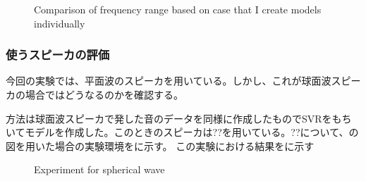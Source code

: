 \begin{figure}[t]
{     \label{fig:6000}}         
     \caption{Comparison of frequency range based on case that I create models individually}
    \label{fig:result_freq_renge_2}
\end{figure}
\clearpage

\subsubsection{使うスピーカの評価}
\label{sec:result_svr_speaker}
今回の実験では、平面波のスピーカを用いている。しかし、これが球面波スピーカの場合ではどうなるのかを確認する。

方法は球面波スピーカで発した音のデータを同様に作成したものでSVRをもちいてモデルを作成した。このときのスピーカは??を用いている。??について、の図を用いた場合の実験環境をに示す。
この実験における結果をに示す

\begin{figure}[tb]
    \centering
    \label{fig:spherical_speaker}
    \label{fig:exp_environment_spherical}
    \caption{Experiment for spherical wave}
    \label{fig:exp_spherical_wave}
\end{figure}

